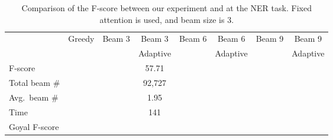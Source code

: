 \documentclass[11pt,a4paper]{article}
\begin{document}
\begin{table*}[ht]
\centering
\caption{Comparison of the F-score between our experiment and \cite{goyal2017continuous} at the NER task. Fixed attention is used, and beam size is 3.}
\label{tab:comp}
\begin{tabular}{lccccccc}
\toprule
& Greedy & Beam 3 & Beam 3 & Beam 6 & Beam 6 & Beam 9 & Beam 9 \\
& & & Adaptive & & Adaptive & & Adaptive \\
\midrule
F-score & & & 57.71 & & & & \\
Total beam \# & & & 92,727 & & & & \\
Avg.~beam \# & & & 1.95 & & & & \\
Time & & & 141 & & & & \\
Goyal F-score & & & & & & & \\ \bottomrule
\end{tabular}
\end{table*}







%
%


\end{document}
